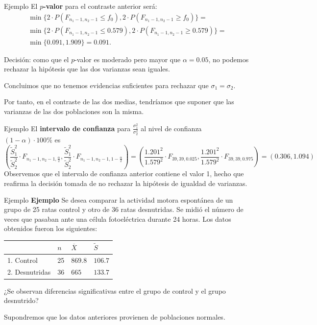 \documentclass[
  ignorenonframetext,
]{beamer}
\begin{document}
\begin{frame}{Ejemplo}
\protect\hypertarget{ejemplo-50}{}
El \textbf{\(p\)-valor} para el contraste anterior será: \[
\begin{array}{l}
\min\{2\cdot P(F_{n_1-1,n_2-1}\leq f_0),2\cdot P(F_{n_1-1,n_2-1}\geq f_0)\}= \\
\min\{2\cdot P(F_{n_1-1,n_2-1}\leq 0.579),2\cdot P(F_{n_1-1,n_2-1}\geq 0.579)\} 
= \\ \min\{0.091,1.909\}=0.091.
\end{array}
\]

Decisión: como que el \(p\)-valor es moderado pero mayor que
\(\alpha=0.05\), no podemos rechazar la hipótesis que las dos varianzas
sean iguales.

Concluimos que no tenemos evidencias suficientes para rechazar que
\(\sigma_1= \sigma_2\).

Por tanto, en el contraste de las dos medias, tendríamos que suponer que
las varianzas de las dos poblaciones son la misma.
\end{frame}

\begin{frame}{Ejemplo}
\protect\hypertarget{ejemplo-51}{}
El \textbf{intervalo de confianza} para
\(\frac{\sigma_1^2}{\sigma_2^2}\) al nivel de confianza
\((1-\alpha)\cdot 100\%\) es \[
\left(\frac{\widetilde{S}_1^2}{\widetilde{S}_2^2}\cdot F_{n_1-1,n_2-1,\frac{\alpha}2},\frac{\widetilde{S}_1^2}{\widetilde{S}_2^2}\cdot F_{n_1-1,n_2-1,1-\frac{\alpha}2}\right) =
\left(\frac{1.201^2}{1.579^2}\cdot F_{39,39,0.025},\frac{1.201^2}{1.579^2}\cdot F_{39,39,0.975}\right)=(0.306,1.094)
\] Observemos que el intervalo de confianza anterior contiene el valor
1, hecho que reafirma la decisión tomada de no rechazar la hipótesis de
igualdad de varianzas.
\end{frame}

\begin{frame}{Ejemplo}
\protect\hypertarget{ejemplo-52}{}
\textbf{Ejemplo} Se desea comparar la actividad motora espontánea de un
grupo de 25 ratas control y otro de 36 ratas desnutridas. Se midió el
número de veces que pasaban ante una célula fotoeléctrica durante 24
horas. Los datos obtenidos fueron los siguientes:

\begin{longtable}[]{@{}llll@{}}
\toprule
& \(n\) & \(\overline{X}\) & \(\widetilde{S}\)\tabularnewline
\midrule
\endhead
1. Control & 25 & \(869.8\) & \(106.7\)\tabularnewline
2. Desnutridas & 36 & \(665\) & \(133.7\)\tabularnewline
\bottomrule
\end{longtable}

¿Se observan diferencias significativas entre el grupo de control y el
grupo desnutrido?

Supondremos que los datos anteriores provienen de poblaciones normales.
\end{frame}
\end{document}
